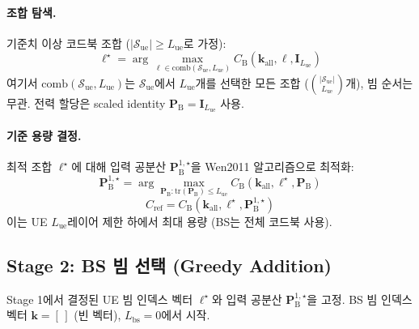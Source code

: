 \documentclass[10pt]{article}
\begin{document}
\paragraph{조합 탐색.}
기준치 이상 코드북 조합 ($|\mathcal{S}_{\text{ue}}| \geq L_{\text{ue}}$로 가정):
\begin{equation}
\boldsymbol{\ell}^{\star} = \arg\max_{\boldsymbol{\ell} \in \text{comb}(\mathcal{S}_{\text{ue}}, L_{\text{ue}})} C_{\text{B}}(\boldsymbol{k}_{\text{all}}, \boldsymbol{\ell}, \mathbf{I}_{L_{\text{ue}}})
\end{equation}
여기서 $\text{comb}(\mathcal{S}_{\text{ue}}, L_{\text{ue}})$는 $\mathcal{S}_{\text{ue}}$에서 $L_{\text{ue}}$개를 선택한 모든 조합 ($\binom{|\mathcal{S}_{\text{ue}}|}{L_{\text{ue}}}$개), 빔 순서는 무관. 전력 할당은 scaled identity $\mathbf{P}_{\text{B}} = \mathbf{I}_{L_{\text{ue}}}$ 사용.

\paragraph{기준 용량 결정.}
최적 조합 $\boldsymbol{\ell}^{\star}$에 대해 입력 공분산 $\mathbf{P}_{\text{B}}^{1,\star}$을 Wen2011 알고리즘으로 최적화:
\begin{equation}
\mathbf{P}_{\text{B}}^{1,\star} = \arg\max_{\mathbf{P}_{\text{B}}: \text{tr}(\mathbf{P}_{\text{B}}) \leq L_{\text{ue}}} C_{\text{B}}(\boldsymbol{k}_{\text{all}}, \boldsymbol{\ell}^{\star}, \mathbf{P}_{\text{B}})
\end{equation}
\begin{equation}
C_{\text{ref}} = C_{\text{B}}(\boldsymbol{k}_{\text{all}}, \boldsymbol{\ell}^{\star}, \mathbf{P}_{\text{B}}^{1,\star})
\end{equation}
이는 UE $L_{\text{ue}}$레이어 제한 하에서 최대 용량 (BS는 전체 코드북 사용).

\subsection{Stage 2: BS 빔 선택 (Greedy Addition)}

Stage 1에서 결정된 UE 빔 인덱스 벡터 $\boldsymbol{\ell}^{\star}$와 입력 공분산 $\mathbf{P}_{\text{B}}^{1,\star}$을 고정. BS 빔 인덱스 벡터 $\boldsymbol{k} = [\,]$ (빈 벡터), $L_{\text{bs}} = 0$에서 시작.
\end{document}
